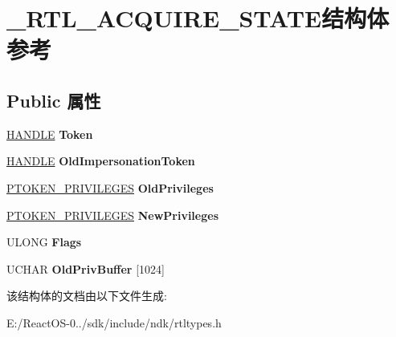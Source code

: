 \hypertarget{struct___r_t_l___a_c_q_u_i_r_e___s_t_a_t_e}{}\section{\+\_\+\+R\+T\+L\+\_\+\+A\+C\+Q\+U\+I\+R\+E\+\_\+\+S\+T\+A\+T\+E结构体 参考}
\label{struct___r_t_l___a_c_q_u_i_r_e___s_t_a_t_e}
\subsection*{Public 属性}
\begin{DoxyCompactItemize}
\item 
\mbox{\label{struct___r_t_l___a_c_q_u_i_r_e___s_t_a_t_e_a9777406336b3aec273bcb5f7c6f2b9a3}} 
\hyperlink{interfacevoid}{H\+A\+N\+D\+LE} {\bfseries Token}
\item 
\mbox{\label{struct___r_t_l___a_c_q_u_i_r_e___s_t_a_t_e_a7131fc3799b106f5dd577eff489bc837}} 
\hyperlink{interfacevoid}{H\+A\+N\+D\+LE} {\bfseries Old\+Impersonation\+Token}
\item 
\mbox{\label{struct___r_t_l___a_c_q_u_i_r_e___s_t_a_t_e_ad45bb59e04292ef534191da73a6c34ab}} 
\hyperlink{struct___t_o_k_e_n___p_r_i_v_i_l_e_g_e_s}{P\+T\+O\+K\+E\+N\+\_\+\+P\+R\+I\+V\+I\+L\+E\+G\+ES} {\bfseries Old\+Privileges}
\item 
\mbox{\label{struct___r_t_l___a_c_q_u_i_r_e___s_t_a_t_e_aaf8a80f29bdafdf5720929331c0716ad}} 
\hyperlink{struct___t_o_k_e_n___p_r_i_v_i_l_e_g_e_s}{P\+T\+O\+K\+E\+N\+\_\+\+P\+R\+I\+V\+I\+L\+E\+G\+ES} {\bfseries New\+Privileges}
\item 
\mbox{\label{struct___r_t_l___a_c_q_u_i_r_e___s_t_a_t_e_a16aee9ee98c93ed42a3e90c59e426f0c}} 
U\+L\+O\+NG {\bfseries Flags}
\item 
\mbox{\label{struct___r_t_l___a_c_q_u_i_r_e___s_t_a_t_e_aa61524fc3a17c25ca24ad5ddbef57dbf}} 
U\+C\+H\+AR {\bfseries Old\+Priv\+Buffer} \mbox{[}1024\mbox{]}
\end{DoxyCompactItemize}


该结构体的文档由以下文件生成\+:\begin{DoxyCompactItemize}
\item 
E\+:/\+React\+O\+S-\/0../sdk/include/ndk/rtltypes.\+h\end{DoxyCompactItemize}
